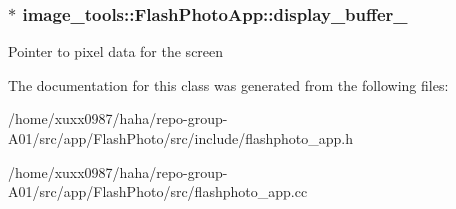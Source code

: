 \subsubsection[{\texorpdfstring{display\+\_\+buffer\+\_\+}{display_buffer_}}]{$\ast$ image\+\_\+tools\+::\+Flash\+Photo\+App\+::display\+\_\+buffer\+\_\+\hspace{0.3cm}{\ttfamily [private]}}\hypertarget{classimage__tools_1_1FlashPhotoApp_ad0a08d5606cfc5aa02412303147c612d}{}\label{classimage__tools_1_1FlashPhotoApp_ad0a08d5606cfc5aa02412303147c612d}
Pointer to pixel data for the screen 

The documentation for this class was generated from the following files\+:\begin{DoxyCompactItemize}
\item 
/home/xuxx0987/haha/repo-\/group-\/\+A01/src/app/\+Flash\+Photo/src/include/flashphoto\+\_\+app.\+h\item 
/home/xuxx0987/haha/repo-\/group-\/\+A01/src/app/\+Flash\+Photo/src/flashphoto\+\_\+app.\+cc\end{DoxyCompactItemize}
